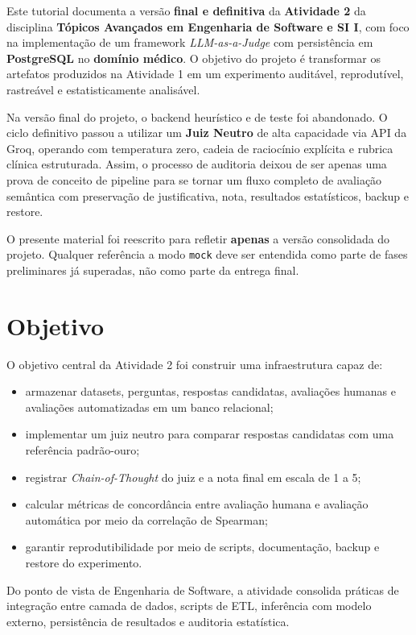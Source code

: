 \documentclass[12pt,a4paper]{article}
\begin{document}
Este tutorial documenta a versão \textbf{final e definitiva} da \textbf{Atividade 2} da disciplina \textbf{Tópicos Avançados em Engenharia de Software e SI I}, com foco na implementação de um framework \textit{LLM-as-a-Judge} com persistência em \textbf{PostgreSQL} no \textbf{domínio médico}. O objetivo do projeto é transformar os artefatos produzidos na Atividade 1 em um experimento auditável, reprodutível, rastreável e estatisticamente analisável.

Na versão final do projeto, o backend heurístico e de teste foi abandonado. O ciclo definitivo passou a utilizar um \textbf{Juiz Neutro} de alta capacidade via API da Groq, operando com temperatura zero, cadeia de raciocínio explícita e rubrica clínica estruturada. Assim, o processo de auditoria deixou de ser apenas uma prova de conceito de pipeline para se tornar um fluxo completo de avaliação semântica com preservação de justificativa, nota, resultados estatísticos, backup e restore.

O presente material foi reescrito para refletir \textbf{apenas} a versão consolidada do projeto. Qualquer referência a modo \texttt{mock} deve ser entendida como parte de fases preliminares já superadas, não como parte da entrega final.

\section{Objetivo}

O objetivo central da Atividade 2 foi construir uma infraestrutura capaz de:

\begin{itemize}[leftmargin=1.2cm]
    \item armazenar datasets, perguntas, respostas candidatas, avaliações humanas e avaliações automatizadas em um banco relacional;
    \item implementar um juiz neutro para comparar respostas candidatas com uma referência padrão-ouro;
    \item registrar \textit{Chain-of-Thought} do juiz e a nota final em escala de 1 a 5;
    \item calcular métricas de concordância entre avaliação humana e avaliação automática por meio da correlação de Spearman;
    \item garantir reprodutibilidade por meio de scripts, documentação, backup e restore do experimento.
\end{itemize}

Do ponto de vista de Engenharia de Software, a atividade consolida práticas de integração entre camada de dados, scripts de ETL, inferência com modelo externo, persistência de resultados e auditoria estatística.
\end{document}
